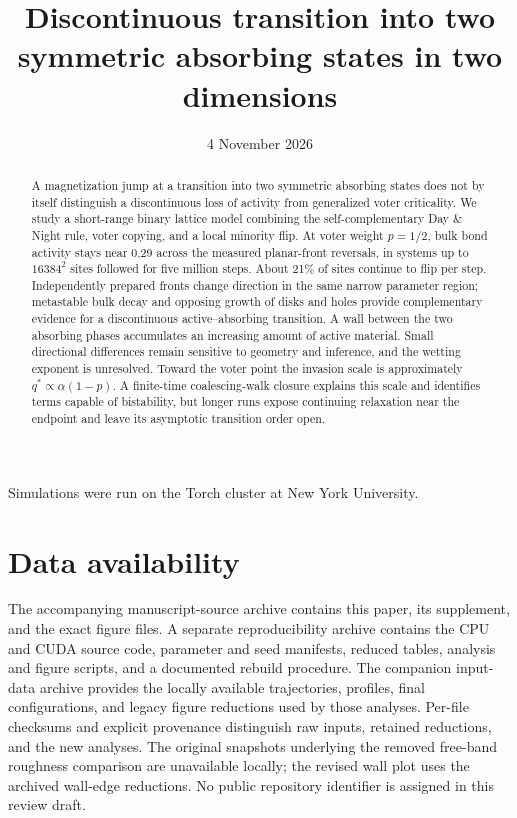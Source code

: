 


\title{Discontinuous transition into two symmetric absorbing states in two dimensions}
\date{4 November 2026}
\begin{abstract}
A magnetization jump at a transition into two symmetric absorbing states
does not by itself distinguish a discontinuous loss of activity from
generalized voter criticality. We study a short-range binary lattice model
combining the self-complementary Day \& Night rule, voter copying, and a
local minority flip. At voter weight $p=1/2$, bulk bond activity stays near
0.29 across the measured planar-front reversals, in systems up to
$16384^2$ sites followed for five million steps. About 21\% of sites
continue to flip per step. Independently prepared fronts change direction
in the same narrow parameter region; metastable bulk decay and opposing
growth of disks and holes provide complementary evidence for a
discontinuous active--absorbing transition. A wall between the two absorbing
phases accumulates an increasing amount of active material. Small
directional differences remain sensitive to geometry and inference, and
the wetting exponent is unresolved. Toward the voter point the invasion
scale is approximately $q^*\propto\alpha(1-p)$. A finite-time coalescing-walk
closure explains this scale and identifies terms capable of bistability,
but longer runs expose continuing relaxation near the endpoint and leave
its asymptotic transition order open.
\end{abstract}
\maketitle
\raggedbottom
\setlength{\parskip}{0pt}











\begin{acknowledgments}
Simulations were run on the Torch cluster at New York University.
\end{acknowledgments}

\section*{Data availability}
The accompanying manuscript-source archive contains this paper, its supplement,
and the exact figure files. A separate reproducibility archive contains the
CPU and CUDA source code, parameter and seed manifests, reduced tables,
analysis and figure scripts, and a documented rebuild procedure.
The companion input-data archive provides the locally available trajectories,
profiles, final configurations, and legacy figure reductions used by those
analyses. Per-file checksums and explicit provenance distinguish raw inputs,
retained reductions, and the new analyses. The original snapshots underlying
the removed free-band roughness comparison are unavailable locally; the
revised wall plot uses the archived wall-edge reductions. No public repository
identifier is assigned in this review draft.



